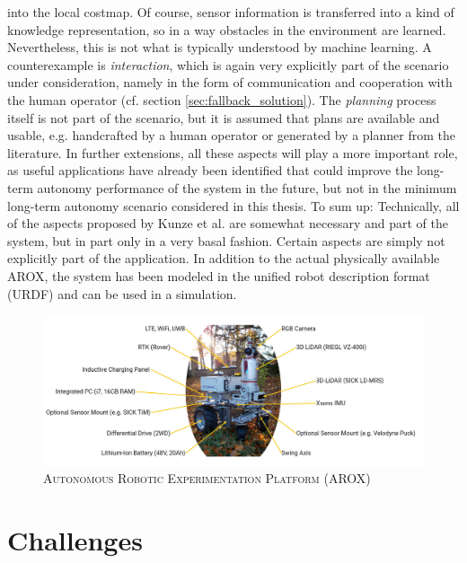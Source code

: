\documentclass[english, master, utf8]{base/thesis_KBS}
\begin{document}
into the local costmap. Of course,
sensor information is transferred into a kind of knowledge representation, so in a way obstacles in the environment are learned. Nevertheless, this is not what is typically
understood by machine learning. A counterexample is \textit{interaction}, which is again very explicitly part of the scenario under consideration, namely in the form of communication and
cooperation with the human operator (cf. section \ref{sec:fallback_solution}). The \textit{planning} process itself is not part of the scenario, but it is assumed that plans are available and usable,
e.g. handcrafted by a human operator or generated by a planner from the literature. In further extensions, all these aspects will play a more important role, as useful applications
have already been identified that could improve the long-term autonomy performance of the system in the future, but not in the minimum long-term autonomy scenario considered in this
thesis. To sum up: Technically, all of the aspects proposed by Kunze et al. are somewhat necessary and part of the system, but in part only in a very basal fashion. Certain aspects
are simply not explicitly part of the application. In addition to the actual physically available AROX, the system has been modeled in the unified robot description format (URDF) and
can be used in a simulation.
\begin{figure}[H]
    \centering
    \includegraphics[width=\textwidth]{pics/AROX.jpg}
    \caption{\textsc{Autonomous Robotic Experimentation Platform (AROX)}}
    \label{fig:arox_system}
\end{figure}

\section{Challenges}
\label{sec:challenges_for_lta}
\end{document}

